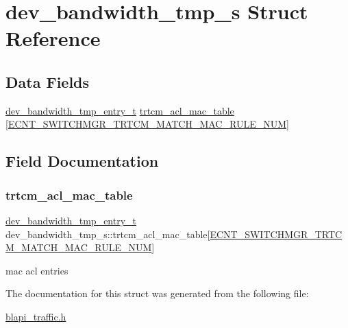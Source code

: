 \hypertarget{structdev__bandwidth__tmp__s}{}\section{dev\+\_\+bandwidth\+\_\+tmp\+\_\+s Struct Reference}
\label{structdev__bandwidth__tmp__s}
\subsection*{Data Fields}
\begin{DoxyCompactItemize}
\item 
\hyperlink{structdev__bandwidth__tmp__entry__s}{dev\+\_\+bandwidth\+\_\+tmp\+\_\+entry\+\_\+t} \hyperlink{structdev__bandwidth__tmp__s_ae082bdcf8fbe09b8474b7800dfd3b29d}{trtcm\+\_\+acl\+\_\+mac\+\_\+table} \mbox{[}\hyperlink{libapi__lib__switchmgr_8h_a3930ec373da9905ced88fe17677c6011}{E\+C\+N\+T\+\_\+\+S\+W\+I\+T\+C\+H\+M\+G\+R\+\_\+\+T\+R\+T\+C\+M\+\_\+\+M\+A\+T\+C\+H\+\_\+\+M\+A\+C\+\_\+\+R\+U\+L\+E\+\_\+\+N\+UM}\mbox{]}
\end{DoxyCompactItemize}


\subsection{Field Documentation}
\mbox{\label{structdev__bandwidth__tmp__s_ae082bdcf8fbe09b8474b7800dfd3b29d}} 
\subsubsection{\texorpdfstring{trtcm\+\_\+acl\+\_\+mac\+\_\+table}{trtcm\_acl\_mac\_table}}
{\footnotesize\ttfamily \hyperlink{structdev__bandwidth__tmp__entry__s}{dev\+\_\+bandwidth\+\_\+tmp\+\_\+entry\+\_\+t} dev\+\_\+bandwidth\+\_\+tmp\+\_\+s\+::trtcm\+\_\+acl\+\_\+mac\+\_\+table\mbox{[}\hyperlink{libapi__lib__switchmgr_8h_a3930ec373da9905ced88fe17677c6011}{E\+C\+N\+T\+\_\+\+S\+W\+I\+T\+C\+H\+M\+G\+R\+\_\+\+T\+R\+T\+C\+M\+\_\+\+M\+A\+T\+C\+H\+\_\+\+M\+A\+C\+\_\+\+R\+U\+L\+E\+\_\+\+N\+UM}\mbox{]}}

mac acl entries 

The documentation for this struct was generated from the following file\+:\begin{DoxyCompactItemize}
\item 
\hyperlink{blapi__traffic_8h}{blapi\+\_\+traffic.\+h}\end{DoxyCompactItemize}
